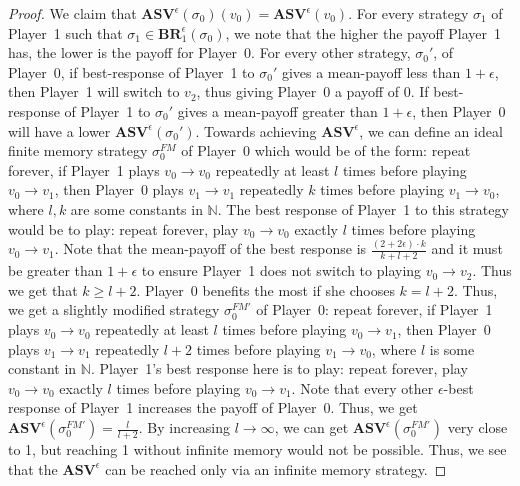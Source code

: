 \begin{proof}
We claim that $\mathbf{ASV}^{\epsilon}(\sigma_0)(v_0) = \mathbf{ASV}^{\epsilon}(v_0)$. For every strategy $\sigma_1$ of Player~1 such that $\sigma_1 \in \mathbf{BR}_1^{\epsilon}(\sigma_0)$, we note that the higher the payoff Player~1 has, the lower is the payoff for Player~0. For every other strategy, $\sigma_0'$, of Player~0, if best-response of Player~1 to $\sigma_0'$ gives a mean-payoff less than $1+\epsilon$, then Player~1 will switch to $v_2$, thus giving Player~0 a payoff of 0. If best-response of Player~1 to $\sigma_0'$ gives a mean-payoff greater than $1+\epsilon$, then Player~0 will have a lower $\mathbf{ASV}^{\epsilon}(\sigma_0')$. Towards achieving $\mathbf{ASV}^{\epsilon}$, we can define an ideal finite memory strategy $\sigma_0^{FM}$ of Player~0 which would be of the form: repeat forever, if Player~1 plays $v_0 \to v_0$ repeatedly at least $l$ times before playing $v_0 \to v_1$, then Player~0 plays $v_1 \to v_1$ repeatedly $k$ times before playing $v_1 \to v_0$, where $l, k$ are some constants in $\mathbb{N}$. The best response of Player~1 to this strategy would be to play: repeat forever, play $v_0 \to v_0$ exactly $l$ times before playing $v_0 \to v_1$. Note that the mean-payoff of the best response is $\frac{(2+2\epsilon)\cdot k}{k + l + 2}$ and it must be greater than $1 + \epsilon$ to ensure Player~1 does not switch to playing $v_0 \to v_2$. Thus we get that $k \geqslant l + 2$. Player~0 benefits the most if she chooses $k = l+2$. Thus, we get a slightly modified strategy $\sigma_0^{FM'}$ of Player~0: repeat forever, if Player~1 plays $v_0 \to v_0$ repeatedly at least $l$ times before playing $v_0 \to v_1$, then Player~0 plays $v_1 \to v_1$ repeatedly $l+2$ times before playing $v_1 \to v_0$, where $l$ is  some constant in $\mathbb{N}$. Player~1's best response here is to play: repeat forever, play $v_0 \to v_0$ exactly $l$ times before playing $v_0 \to v_1$. Note that every other $\epsilon$-best response of Player~1 increases the payoff of Player~0. Thus, we get $\mathbf{ASV}^{\epsilon}(\sigma_0^{FM'}) = \frac{l}{l+2}$. By increasing $l \to \infty$, we can get $\mathbf{ASV}^{\epsilon}(\sigma_0^{FM'})$ very close to 1, but reaching 1 without infinite memory would not be possible. Thus, we see that the $\mathbf{ASV}^{\epsilon}$ can be reached only via an infinite memory strategy.
\end{proof}